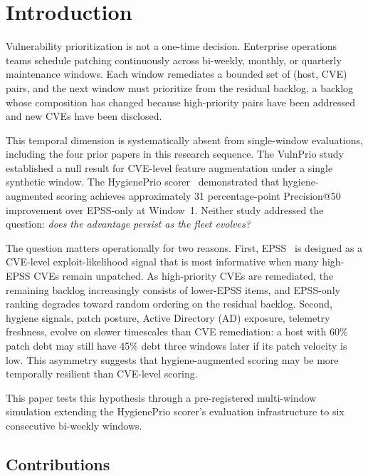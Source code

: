 \section{Introduction}

Vulnerability prioritization is not a one-time decision. Enterprise operations teams schedule patching continuously across bi-weekly, monthly, or quarterly maintenance windows. Each window remediates a bounded set of (host, CVE) pairs, and the next window must prioritize from the residual backlog, a backlog whose composition has changed because high-priority pairs have been addressed and new CVEs have been disclosed.

This temporal dimension is systematically absent from single-window evaluations, including the four prior papers in this research sequence. The VulnPrio study~\cite{paper1vulnprio} established a null result for CVE-level feature augmentation under a single synthetic window. The HygienePrio scorer~\cite{paper4hygieneprio} demonstrated that hygiene-augmented scoring achieves approximately 31 percentage-point Precision@50 improvement over EPSS-only at Window~1. Neither study addressed the question: \textit{does the advantage persist as the fleet evolves?}

The question matters operationally for two reasons. First, EPSS~\cite{jacobs2021epss} is designed as a CVE-level exploit-likelihood signal that is most informative when many high-EPSS CVEs remain unpatched. As high-priority CVEs are remediated, the remaining backlog increasingly consists of lower-EPSS items, and EPSS-only ranking degrades toward random ordering on the residual backlog. Second, hygiene signals, patch posture, Active Directory (AD) exposure, telemetry freshness, evolve on slower timescales than CVE remediation: a host with 60\% patch debt may still have 45\% debt three windows later if its patch velocity is low. This asymmetry suggests that hygiene-augmented scoring may be more temporally resilient than CVE-level scoring.

This paper tests this hypothesis through a pre-registered multi-window simulation extending the HygienePrio scorer's evaluation infrastructure to six consecutive bi-weekly windows.

\subsection{Contributions}

